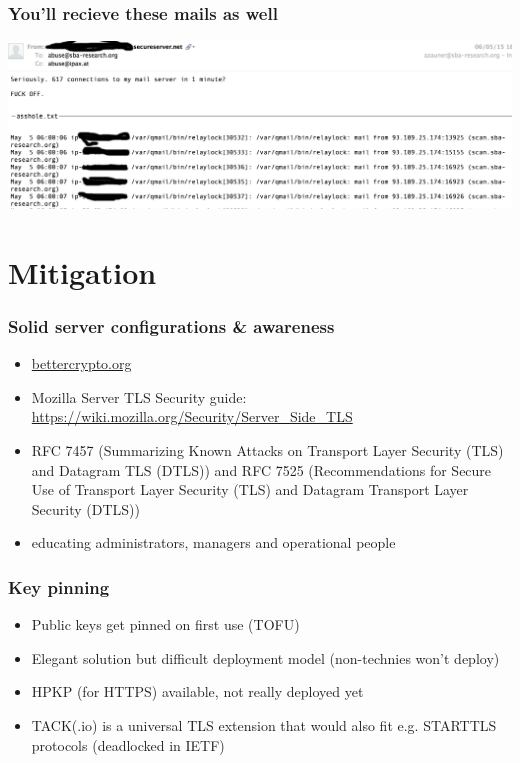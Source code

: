 \documentclass[14pt,aspectratio=43]{beamer}
\begin{document}
\begin{frame}
  \frametitle{You'll recieve these mails as well}
  \begin{center}
     \includegraphics*[scale=0.32]{images/abusemail.png}
  \end{center}
\end{frame}

\section{Mitigation}
\sectionpage

\begin{frame}
  \frametitle{Solid server configurations \& awareness}
  \begin{center}
  \begin{itemize}
    \item \url{bettercrypto.org}
    \item Mozilla Server TLS Security guide: \url{https://wiki.mozilla.org/Security/Server_Side_TLS}
    \item RFC 7457 (Summarizing Known Attacks on Transport Layer Security (TLS) and Datagram TLS (DTLS)) and RFC 7525 (Recommendations for Secure Use of Transport Layer Security (TLS) and Datagram Transport Layer Security (DTLS))
    \item educating administrators, managers and operational people
  \end{itemize}
  \end{center}
\end{frame}

\begin{frame}
  \frametitle{Key pinning}
  \begin{center}
  \begin{itemize}
    \item Public keys get pinned on first use (TOFU)
    \item Elegant solution but difficult deployment model (non-technies won't deploy)
    \item HPKP (for HTTPS) available, not really deployed yet
    \item TACK(.io) is a universal TLS extension that would also fit e.g. STARTTLS protocols (deadlocked in IETF)
  \end{itemize}
  \end{center}
\end{frame}
\end{document}
